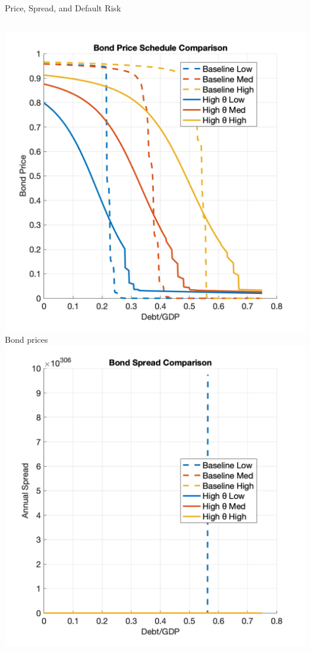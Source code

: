 \documentclass[aspectratio=169,11pt,professionalfonts]{beamer}
\newcommand{\1}{\mathbb{1}}
\begin{document}
\begin{frame}{Price, Spread, and Default Risk}
  \begin{columns}[T,onlytextwidth]
    \includegraphics[width=\linewidth]{bond_price_comparison.png}\\[0.3em]
    {\scriptsize Bond prices}
    \includegraphics[width=\linewidth]{spread_comparison.png}\\[0.3em]

\end{columns}
\end{frame}
\end{document}
